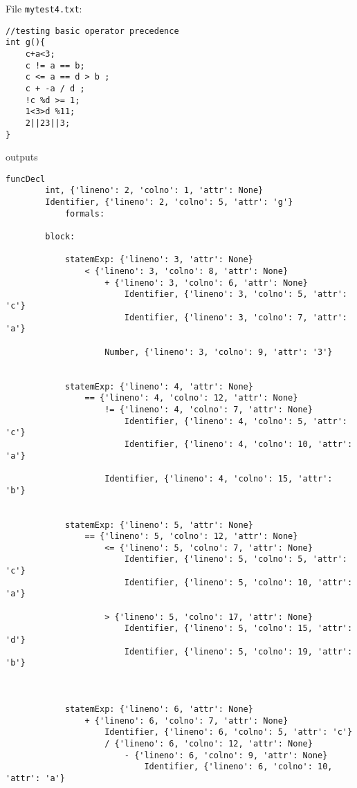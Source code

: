 \documentclass{article}
\begin{document}
\begin{itemize}
        File \verb|mytest4.txt|:
        \begin{verbatim}
//testing basic operator precedence
int g(){
    c+a<3;
    c != a == b;
    c <= a == d > b ;
    c + -a / d ;
    !c %d >= 1;
    1<3>d %11;
    2||23||3;
}
        \end{verbatim}
        outputs
        \begin{verbatim}
funcDecl
        int, {'lineno': 2, 'colno': 1, 'attr': None}
        Identifier, {'lineno': 2, 'colno': 5, 'attr': 'g'}
            formals:

        block:

            statemExp: {'lineno': 3, 'attr': None}
                < {'lineno': 3, 'colno': 8, 'attr': None}
                    + {'lineno': 3, 'colno': 6, 'attr': None}
                        Identifier, {'lineno': 3, 'colno': 5, 'attr': 'c'}
                        Identifier, {'lineno': 3, 'colno': 7, 'attr': 'a'}

                    Number, {'lineno': 3, 'colno': 9, 'attr': '3'}


            statemExp: {'lineno': 4, 'attr': None}
                == {'lineno': 4, 'colno': 12, 'attr': None}
                    != {'lineno': 4, 'colno': 7, 'attr': None}
                        Identifier, {'lineno': 4, 'colno': 5, 'attr': 'c'}
                        Identifier, {'lineno': 4, 'colno': 10, 'attr': 'a'}

                    Identifier, {'lineno': 4, 'colno': 15, 'attr': 'b'}


            statemExp: {'lineno': 5, 'attr': None}
                == {'lineno': 5, 'colno': 12, 'attr': None}
                    <= {'lineno': 5, 'colno': 7, 'attr': None}
                        Identifier, {'lineno': 5, 'colno': 5, 'attr': 'c'}
                        Identifier, {'lineno': 5, 'colno': 10, 'attr': 'a'}

                    > {'lineno': 5, 'colno': 17, 'attr': None}
                        Identifier, {'lineno': 5, 'colno': 15, 'attr': 'd'}
                        Identifier, {'lineno': 5, 'colno': 19, 'attr': 'b'}



            statemExp: {'lineno': 6, 'attr': None}
                + {'lineno': 6, 'colno': 7, 'attr': None}
                    Identifier, {'lineno': 6, 'colno': 5, 'attr': 'c'}
                    / {'lineno': 6, 'colno': 12, 'attr': None}
                        - {'lineno': 6, 'colno': 9, 'attr': None}
                            Identifier, {'lineno': 6, 'colno': 10, 'attr': 'a'}


\end{verbatim}
\end{itemize}
\end{document}

